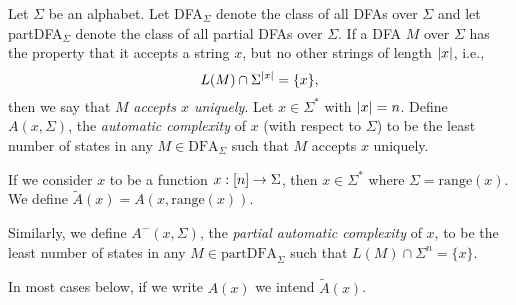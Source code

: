 		\begin{definition}\label{df:A A^-}
			Let $\Sigma$ be an alphabet.
			Let DFA$_\Sigma$ denote the class of all DFAs over $\Sigma$ and let partDFA$_\Sigma$ denote the class of all partial DFAs over $\Sigma$.
			If a DFA $M$ over $\Sigma$ has the property that it accepts a string $x$, but no other strings of length $\lvert x\rvert$, i.e.,
			\[
			L(M)\cap\Sigma^{\lvert x\rvert}=\{x\},
			\]
			then we say that $M$ \emph{accepts $x$ uniquely}.
			Let $x\in\Sigma^*$ with $\lvert x\rvert=n$.
			Define $A(x,\Sigma)$,
			the \emph{automatic complexity} of $x$ (with respect to $\Sigma$)
			to be the least number of states in any $M\in\mathrm{DFA}_\Sigma$ such that $M$ accepts $x$ uniquely.

			If we consider $x$ to be a function $x: [n]\to\Sigma$, then $x\in\Sigma^*$ where $\Sigma=\mathrm{range}(x)$.
			We define $\tilde A(x)=A(x,\mathrm{range}(x))$.

			Similarly, we define $A^-(x,\Sigma)$,
			the \emph{partial automatic complexity} of $x$,
			to be the least number of states in any $M\in\mathrm{partDFA}_\Sigma$ such that $L(M)\cap \Sigma^n=\{x\}$.
		\end{definition}

		In most cases below, if we write $A(x)$ we intend $\tilde A(x)$.


